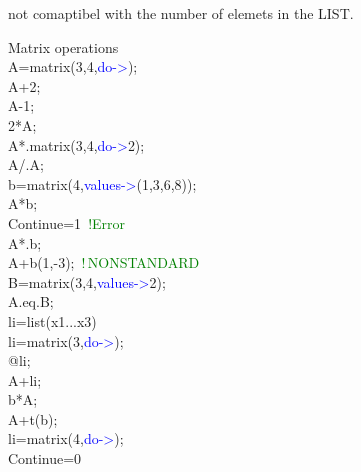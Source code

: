 not comaptibel with the number of elemets in the LIST.
\begin{example}[matrixop]Matrix operations\\
\label{matrixop}
A=\textcolor{VioletRed}{matrix}(3,4,\textcolor{blue}{do->});\\
A+2;\\
A-1;\\
2*A;\\
A*.\textcolor{VioletRed}{matrix}(3,4,\textcolor{blue}{do->}2);\\
A/.A;\\
b=\textcolor{VioletRed}{matrix}(4,\textcolor{blue}{values->}(1,3,6,8));\\
A*b;\\
Continue=1 \,\textcolor{green}{!Error}\\
A*.b;\\
A+b(1,-3); \,\textcolor{green}{!\,NONSTANDARD}\\
B=\textcolor{VioletRed}{matrix}(3,4,\textcolor{blue}{values->}2);\\
A.eq.B;\\
li=\textcolor{VioletRed}{list}(x1...x3)\\
li=\textcolor{VioletRed}{matrix}(3,\textcolor{blue}{do->});\\
@li;\\
A+li;\\
b*A;\\
A+\textcolor{VioletRed}{t}(b);\\
li=\textcolor{VioletRed}{matrix}(4,\textcolor{blue}{do->});\\
Continue=0
\end{example}
